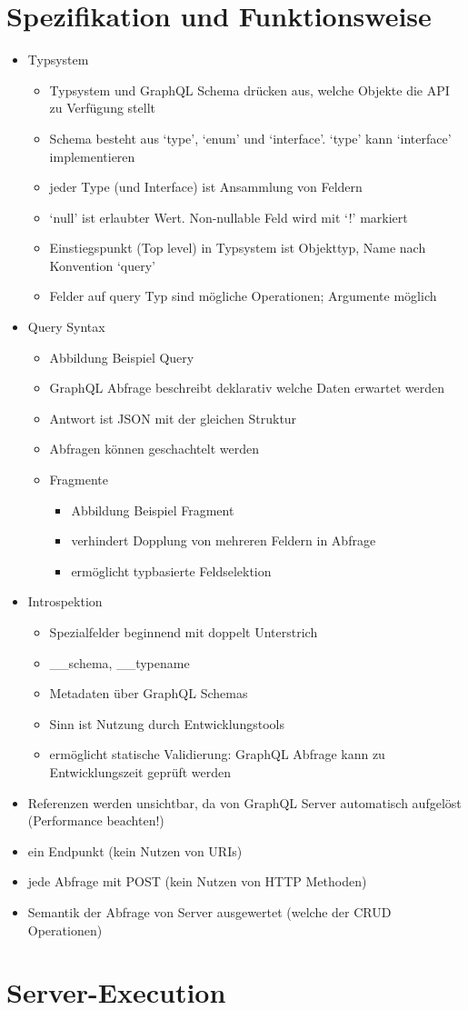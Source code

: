 \section{Spezifikation und Funktionsweise}
\begin{itemize}
  \item Typsystem
  \begin{itemize}
    \item Typsystem und GraphQL Schema drücken aus, welche Objekte die API zu Verfügung stellt
    \item Schema besteht aus `type', `enum' und `interface'. `type' kann `interface' implementieren
    \item jeder Type (und Interface) ist Ansammlung von Feldern
    \item `null' ist erlaubter Wert. Non-nullable Feld wird mit `!' markiert
    \item Einstiegspunkt (Top level) in Typsystem ist Objekttyp, Name nach Konvention `query'
    \item Felder auf query Typ sind mögliche Operationen; Argumente möglich
  \end{itemize}
  \item Query Syntax
  \begin{itemize}
    \item Abbildung Beispiel Query
    \item GraphQL Abfrage beschreibt deklarativ welche Daten erwartet werden
    \item Antwort ist JSON mit der gleichen Struktur
    \item Abfragen können geschachtelt werden
    \item Fragmente
    \begin{itemize}
      \item Abbildung Beispiel Fragment
      \item verhindert Dopplung von mehreren Feldern in Abfrage
      \item ermöglicht typbasierte Feldselektion
    \end{itemize}
  \end{itemize}
  \item Introspektion
  \begin{itemize}
    \item Spezialfelder beginnend mit doppelt Unterstrich
    \item \_\_schema, \_\_typename
    \item Metadaten über GraphQL Schemas
    \item Sinn ist Nutzung durch Entwicklungstools
    \item ermöglicht statische Validierung: GraphQL Abfrage kann zu Entwicklungszeit geprüft werden
  \end{itemize}
  \item Referenzen werden unsichtbar, da von GraphQL Server automatisch aufgelöst (Performance beachten!)
  \item ein Endpunkt (kein Nutzen von URIs)
  \item jede Abfrage mit POST (kein Nutzen von HTTP Methoden)
  \item Semantik der Abfrage von Server ausgewertet (welche der CRUD Operationen)
\end{itemize}

\section{Server-Execution}
